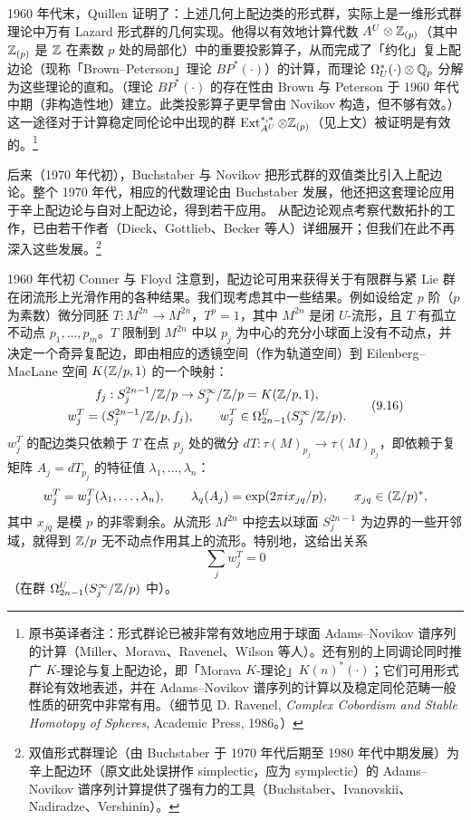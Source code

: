 1960 年代末，Quillen 证明了：上述几何上配边类的形式群，实际上是一维形式群理论中万有 Lazard 形式群的几何实现。他得以有效地计算代数 $A^U\otimes\mathbb{Z}_{(p)}$（其中 $\mathbb{Z}_{(p)}$ 是 $\mathbb{Z}$ 在素数 $p$ 处的局部化）中的重要投影算子，从而完成了「约化」复上配边论（现称「Brown--Peterson」理论 $BP^*(\cdot)$）的计算，而理论 $\Omega_U^*(\cdot)\otimes\mathbb{Q}_p$ 分解为这些理论的直和。（理论 $BP^*(\cdot)$ 的存在性由 Brown 与 Peterson 于 1960 年代中期（非构造性地）建立。此类投影算子更早曾由 Novikov 构造，但不够有效。）这一途径对于计算稳定同伦论中出现的群 $\operatorname{Ext}_{A^U}^{*,*}\otimes\mathbb{Z}_{(p)}$（见上文）被证明是有效的。\footnote{原书英译者注：形式群论已被非常有效地应用于球面 Adams--Novikov 谱序列的计算（Miller、Morava、Ravenel、Wilson 等人）。还有别的上同调论同时推广 $K$-理论与复上配边论，即「Morava $K$-理论」$K(n)^*(\cdot)$；它们可用形式群论有效地表述，并在 Adams--Novikov 谱序列的计算以及稳定同伦范畴一般性质的研究中非常有用。（细节见 D. Ravenel, \emph{Complex Cobordism and Stable Homotopy of Spheres}, Academic Press, 1986。）}

后来（1970 年代初），Buchstaber 与 Novikov 把形式群的双值类比引入上配边论。整个 1970 年代，相应的代数理论由 Buchstaber 发展，他还把这套理论应用于辛上配边论与自对上配边论，得到若干应用。
从配边论观点考察代数拓扑的工作，已由若干作者（Dieck、Gottlieb、Becker 等人）详细展开；但我们在此不再深入这些发展。\footnote{双值形式群理论（由 Buchstaber 于 1970 年代后期至 1980 年代中期发展）为辛上配边环（原文此处误拼作 simplectic，应为 symplectic）的 Adams--Novikov 谱序列计算提供了强有力的工具（Buchstaber、Ivanovskii、Nadiradze、Vershinin）。}

1960 年代初 Conner 与 Floyd 注意到，配边论可用来获得关于有限群与紧 Lie 群在闭流形上光滑作用的各种结果。我们现考虑其中一些结果。例如设给定 $p$ 阶（$p$ 为素数）微分同胚 $T:M^{2n}\to M^{2n}$，$T^p=1$，其中 $M^{2n}$ 是闭 $U$-流形，且 $T$ 有孤立不动点 $p_1,\ldots,p_m$。$T$ 限制到 $M^{2n}$ 中以 $p_j$ 为中心的充分小球面上没有不动点，并决定一个奇异复配边，即由相应的透镜空间（作为轨道空间）到 Eilenberg--MacLane 空间 $K(\mathbb{Z}/p,1)$ 的一个映射：
\begin{equation}
\begin{gathered}
f_j:S_j^{2n-1}/\mathbb{Z}/p\to S_j^\infty/\mathbb{Z}/p=K(\mathbb{Z}/p,1),\\
w_j^T=(S_j^{2n-1}/\mathbb{Z}/p,f_j),\qquad w_j^T\in\Omega_{2n-1}^U(S_j^\infty/\mathbb{Z}/p).
\end{gathered}\tag{9.16}
\end{equation}
$w_j^T$ 的配边类只依赖于 $T$ 在点 $p_j$ 处的微分 $dT:\tau(M)_{p_j}\to\tau(M)_{p_j}$，即依赖于复矩阵 $A_j=dT_{p_j}$ 的特征值 $\lambda_1,\ldots,\lambda_n$：
\[
w_j^T=w_j^T(\lambda_1,\ldots,\lambda_n),\qquad \lambda_q(A_j)=\exp(2\pi ix_{jq}/p),\qquad x_{jq}\in(\mathbb{Z}/p)^*,
\]
其中 $x_{jq}$ 是模 $p$ 的非零剩余。从流形 $M^{2n}$ 中挖去以球面 $S_j^{2n-1}$ 为边界的一些开邻域，就得到 $\mathbb{Z}/p$ 无不动点作用其上的流形。特别地，这给出关系
\[
\sum_jw_j^T=0
\]
（在群 $\Omega_{2n-1}^U(S_j^\infty/\mathbb{Z}/p)$ 中）。

